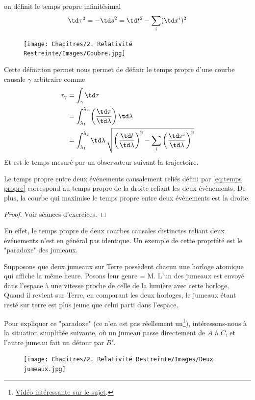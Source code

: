 {on définit le temps propre infinitésimal
\begin{equation}
    \td\tau ^2 = -\td s^{2} = \td t^2 - \sum_{i} (\td x^{i})^2
\end{equation}
\begin{figure}
    \centering
    \texttt{[image: Chapitres/2. Relativité Restreinte/Images/Coubre.jpg]}
    \caption{}
    \label{fig:2.4}
\end{figure}
Cette définition permet nous permet de définir le temps propre d'une courbe causale $\gamma$ arbitraire comme
\begin{align}
    \tau_\gamma &= \int_{\gamma} \td\tau\\
    &= \int^{\lambda_{2}}_{\lambda_{1}}\left(\frac{\td\tau}{\td\lambda}\right)\td\lambda\\
    &= \int^{\lambda_{2}}_{\lambda_{1}} \td \lambda \, \sqrt{\left(\frac{\td t}{\td\lambda}\right)^2 - \sum_{i}\left(\frac{\td x^{i}}{\td\lambda}\right)^2} 
\end{align}
Et est le temps mesuré par un observateur suivant la trajectoire. 
\begin{theoremframe}
    \begin{propri}
        Le temps propre entre deux événements causalement reliés défini par \ref{eq:temps propre} correspond au temps propre de la droite reliant les deux évènements. De plus, la courbe qui maximise le temps propre entre deux évènements est la droite.
    \end{propri}
\end{theoremframe}
\begin{proof}
    Voir séances d'exercices.
\end{proof}
En effet, le temps propre de deux courbes causales distinctes reliant deux événements n'est en général pas identique. Un exemple de cette propriété est le "paradoxe" des jumeaux.

\begin{exmp}
    Supposons que deux jumeaux sur Terre possèdent chacun une horloge atomique qui affiche la même heure. Posons leur genre = M. L'un des jumeaux est envoyé dans l'espace à une vitesse proche de celle de la lumière avec cette horloge. Quand il revient sur Terre, en comparant les deux horloges, le jumeaux étant resté sur terre est plus jeune que celui parti dans l'espace. 
\end{exmp}
Pour expliquer ce "paradoxe" (ce n'en est pas réellement un\footnote{\href{https://www.youtube.com/watch?v=ppX7Qjbe6BM}{Vidéo intéressante sur le sujet}.}), intéressons-nous à la situation simplifiée suivante, où un jumeau passe directement de $A$ à $C$, et l'autre jumeau fait un détour par $B'$.
\begin{figure}[H]
    \centering
    \texttt{[image: Chapitres/2. Relativité Restreinte/Images/Deux jumeaux.jpg]}
    \caption{}
    \label{fig:2.5}
\end{figure}

}
